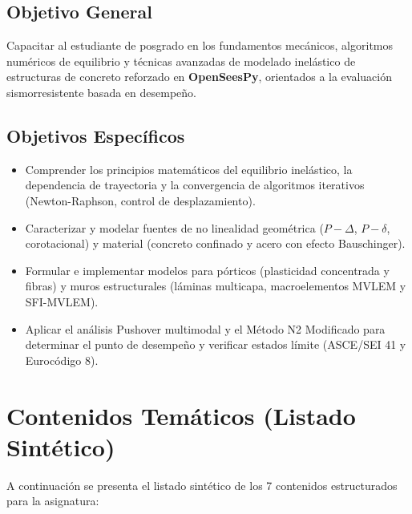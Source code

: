 \documentclass[11pt,letterpaper]{article}
\begin{document}
\subsection{Objetivo General}
Capacitar al estudiante de posgrado en los fundamentos mecánicos, algoritmos numéricos de equilibrio y técnicas avanzadas de modelado inelástico de estructuras de concreto reforzado en \textbf{OpenSeesPy}, orientados a la evaluación sismorresistente basada en desempeño.

\subsection{Objetivos Específicos}
\begin{itemize}[leftmargin=16pt, topsep=1pt, itemsep=1.2pt, parsep=0pt]
    \item Comprender los principios matemáticos del equilibrio inelástico, la dependencia de trayectoria y la convergencia de algoritmos iterativos (Newton-Raphson, control de desplazamiento).
    \item Caracterizar y modelar fuentes de no linealidad geométrica ($P-\Delta$, $P-\delta$, corotacional) y material (concreto confinado y acero con efecto Bauschinger).
    \item Formular e implementar modelos para pórticos (plasticidad concentrada y fibras) y muros estructurales (láminas multicapa, macroelementos MVLEM y SFI-MVLEM).
    \item Aplicar el análisis Pushover multimodal y el Método N2 Modificado para determinar el punto de desempeño y verificar estados límite (ASCE/SEI 41 y Eurocódigo 8).
\end{itemize}

\clearpage


\section{Contenidos Temáticos (Listado Sintético)}

A continuación se presenta el listado sintético de los 7 contenidos estructurados para la asignatura:
\end{document}
